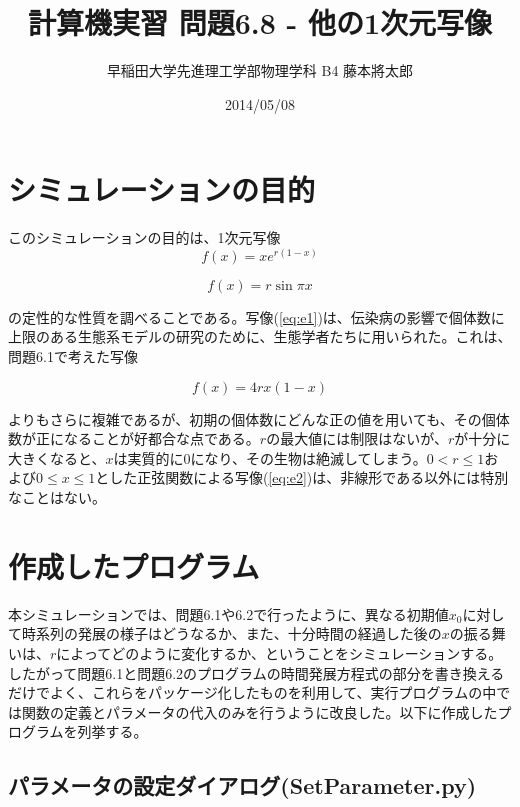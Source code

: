 \documentclass{jsarticle}
\title{計算機実習 問題6.8 - 他の1次元写像}
\author{早稲田大学先進理工学部物理学科 B4 藤本將太郎}
\date{2014/05/08}
\begin{document}
\maketitle

	\section{シミュレーションの目的}
		このシミュレーションの目的は、1次元写像
		\begin{equation}
			f(x)=xe^{r(1-x)}
			\label{eq:e1}
		\end{equation}
		
		\begin{equation}
			f(x)=r\sin{\pi x}
			\label{eq:e2}
		\end{equation}
	
		の定性的な性質を調べることである。写像(\ref{eq:e1})は、伝染病の影響で個体数に上限のある生態系モデルの研究のために、生態学者たちに用いられた。これは、問題6.1で考えた写像
		
		\begin{equation}
			f(x)=4rx(1-x)
			\label{eq:e3}
		\end{equation}
		
		よりもさらに複雑であるが、初期の個体数にどんな正の値を用いても、その個体数が正になることが好都合な点である。$r$の最大値には制限はないが、$r$が十分に大きくなると、$x$は実質的に0になり、その生物は絶滅してしまう。$0 < r \le 1 $および$0 \le x \le 1$とした正弦関数による写像(\ref{eq:e2})は、非線形である以外には特別なことはない。

	\section{作成したプログラム}
		本シミュレーションでは、問題6.1や6.2で行ったように、異なる初期値$x_{0}$に対して時系列の発展の様子はどうなるか、また、十分時間の経過した後の$x$の振る舞いは、$r$によってどのように変化するか、ということをシミュレーションする。したがって問題6.1と問題6.2のプログラムの時間発展方程式の部分を書き換えるだけでよく、これらをパッケージ化したものを利用して、実行プログラムの中では関数の定義とパラメータの代入のみを行うように改良した。以下に作成したプログラムを列挙する。
		
		\subsection{パラメータの設定ダイアログ(SetParameter.py)}
		
\end{document}
